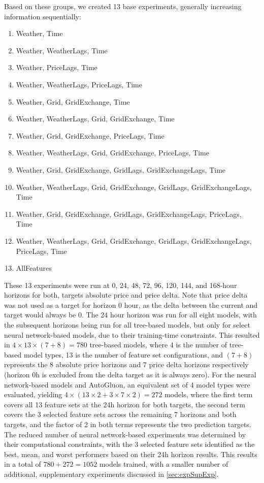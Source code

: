 Based on these groups, we created 13 base experiments, generally increasing 
information sequentially: 
\begin{enumerate}
	\item Weather, Time
	\item Weather, WeatherLags, Time
	\item Weather, PriceLags, Time
	\item Weather, WeatherLags, PriceLags, Time
	\item Weather, Grid, GridExchange, Time
	\item Weather, WeatherLags, Grid, 
	GridExchange, Time
	\item Weather, Grid, GridExchange, PriceLags, 
	Time
	\item Weather, WeatherLags, Grid, 
	GridExchange, PriceLags, Time
	\item Weather, Grid, GridExchange, GridLags, 
	GridExchangeLags, Time
	\item Weather, WeatherLags, Grid, 
	GridExchange, GridLags,	GridExchangeLags, 
	Time
	\item Weather, Grid, GridExchange, GridLags, 
	GridExchangeLags, PriceLags, Time
	\item Weather, WeatherLags, Grid, 
	GridExchange, GridLags, GridExchangeLags, 
	PriceLags, Time
	\item AllFeatures
\end{enumerate}
These 13 experiments were run at 0, 24, 48, 72, 96, 120, 144, and 168-hour 
horizons for both, targets absolute price and price delta. Note that price 
delta was 
not used as a target for horizon 0 hour, as the delta between the current and 
target would always be 0. The 24 hour horizon was run for all eight models, 
with the subsequent horizons being run for all tree-based models, but only for 
select neural network-based models, due to their training-time constraints. 
This resulted in $4 \times 13 \times (7+8) = 780$ tree-based models, where 4 is 
the number of tree-based model types, 13 is the number of feature set 
configurations, and $(7+8)$ represents the 8 absolute price horizons and 7 
price delta horizons respectively (horizon 0h is excluded from the delta target 
as it is always zero). For the neural network-based models and AutoGluon, an 
equivalent set of 4 model types were evaluated, yielding $4 \times (13 \times 2 
+ 3 \times 7 \times 2) = 272$ models, where the first term covers all 13 
feature sets at the 24h horizon for both targets, the second term covers the 3 
selected feature sets across the remaining 7 horizons and both targets, and the 
factor of 2 in both terms represents the two prediction targets. The reduced 
number of neural network-based experiments was determined by their 
computational constraints, with the 3 selected feature sets identified as the 
best, mean, and worst performers based on their 24h horizon results. This 
results in a total of $780 + 272 = 1052$ models trained, with
a smaller number of additional, supplementary experiments
discussed in \autoref{sec:expSupExp}.

